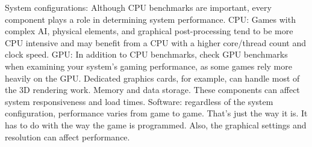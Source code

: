 System configurations:
Although CPU benchmarks are important, every component plays a role in determining system performance.
CPU: Games with complex AI, physical elements, and graphical post-processing tend to be more CPU intensive and may benefit from a CPU with a higher core/thread count and clock speed.
GPU: In addition to CPU benchmarks, check GPU benchmarks when examining your system's gaming performance, as some games rely more heavily on the GPU. Dedicated graphics cards, for example, can handle most of the 3D rendering work.
Memory and data storage. These components can affect system responsiveness and load times.
Software: regardless of the system configuration, performance varies from game to game. That's just the way it is. It has to do with the way the game is programmed. Also, the graphical settings and resolution can affect performance.

